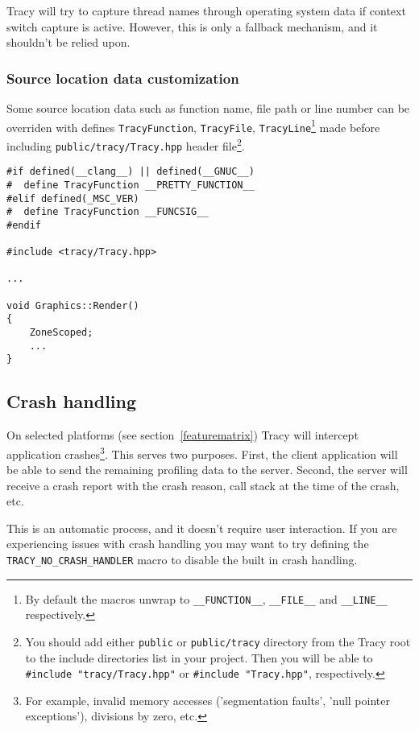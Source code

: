 \documentclass[hidelinks,titlepage,a4paper,twoside]{article}
\begin{document}
Tracy will try to capture thread names through operating system data if context switch capture is active. However, this is only a fallback mechanism, and it shouldn't be relied upon.

\subsubsection{Source location data customization}

Some source location data such as function name, file path or line number can be overriden with defines \texttt{TracyFunction}, \texttt{TracyFile}, \texttt{TracyLine}\footnote{By default the macros unwrap to \texttt{\_\_FUNCTION\_\_}, \texttt{\_\_FILE\_\_} and \texttt{\_\_LINE\_\_} respectively.} made before including \texttt{public/tracy/Tracy.hpp} header file\footnote{You should add either \texttt{public} or \texttt{public/tracy} directory from the Tracy root to the include directories list in your project. Then you will be able to \texttt{\#include "tracy/Tracy.hpp"} or \texttt{\#include "Tracy.hpp"}, respectively.}.

\begin{lstlisting}
#if defined(__clang__) || defined(__GNUC__)
#  define TracyFunction __PRETTY_FUNCTION__
#elif defined(_MSC_VER)
#  define TracyFunction __FUNCSIG__
#endif

#include <tracy/Tracy.hpp>

...

void Graphics::Render()
{
    ZoneScoped;
    ...
}
\end{lstlisting}

\subsection{Crash handling}
\label{crashhandling}

On selected platforms (see section~\ref{featurematrix}) Tracy will intercept application crashes\footnote{For example, invalid memory accesses ('segmentation faults', 'null pointer exceptions'), divisions by zero, etc.}. This serves two purposes. First, the client application will be able to send the remaining profiling data to the server. Second, the server will receive a crash report with the crash reason, call stack at the time of the crash, etc.

This is an automatic process, and it doesn't require user interaction. If you are experiencing issues with crash handling you may want to try defining the \texttt{TRACY\_NO\_CRASH\_HANDLER} macro to disable the built in crash handling.
\end{document}
